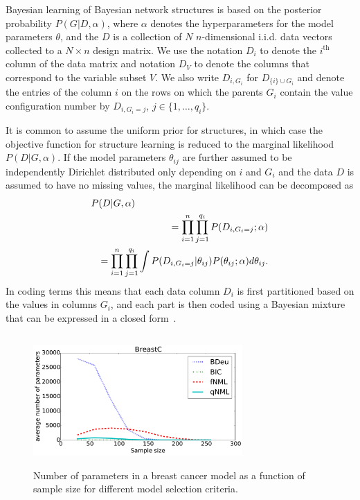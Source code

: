 Bayesian learning of Bayesian network structures is based on the
posterior probability $P(G|D,\alpha)$, where $\alpha$ denotes the
hyperparameters for the model parameters $\theta$, and the $D$ is a
collection of $N$ $n$\nobreakdash-dimensional i.i.d. data vectors
collected to a $N\times n$ design matrix. We use the notation $D_i$ to
denote the $i^\text{th}$ column of the data matrix and notation $D_V$ to denote
the columns that correspond to the variable subset $V$. We also write
$D_{i,G_i}$ for $D_{\{i\}\cup G_i}$ and denote the entries of the
column $i$ on the rows on which the parents $G_i$ contain the value
configuration number by $D_{i,G_i=j}$, $j\in\{1,\ldots,q_i\}$.

It is common to assume the uniform prior for structures, in which case
the objective function for structure learning is reduced to the
marginal likelihood $P(D|G,\alpha)$.  If the model parameters
$\theta_{ij}$ are further assumed to be independently Dirichlet
distributed only depending on $i$ and $G_{i}$ and the data $D$ is
assumed to have no missing values, the marginal likelihood can be
decomposed as
\begin{eqnarray}
\label{eqn:bayesmix}
\lefteqn{P(D|G,\alpha)}\nonumber\\
&&=\prod_{i=1}^{n}\prod_{j=1}^{q_i}P(D_{i,G_i=j};\alpha)\nonumber\\
&&=\prod_{i=1}^{n}\prod_{j=1}^{q_i}\int P(D_{i,G_i=j}|\theta_{ij})P(\theta_{ij};\alpha) d\theta_{ij}.
\end{eqnarray}
In coding terms this means that each data column $D_i$ is first
partitioned based on the values in columns $G_i$, and each part is
then coded using a Bayesian mixture that can be expressed in a closed
form~\cite{Bunt91, Heck95}. 

\begin{figure}
\centering
\includegraphics[width=8cm,height=5cm]{qNML_images/breast_cancer_npmean.pdf}
\caption{Number of parameters in a breast cancer model as a function
  of sample size for different model selection criteria.}
\label{fig:bcnpmean}
\end{figure}


